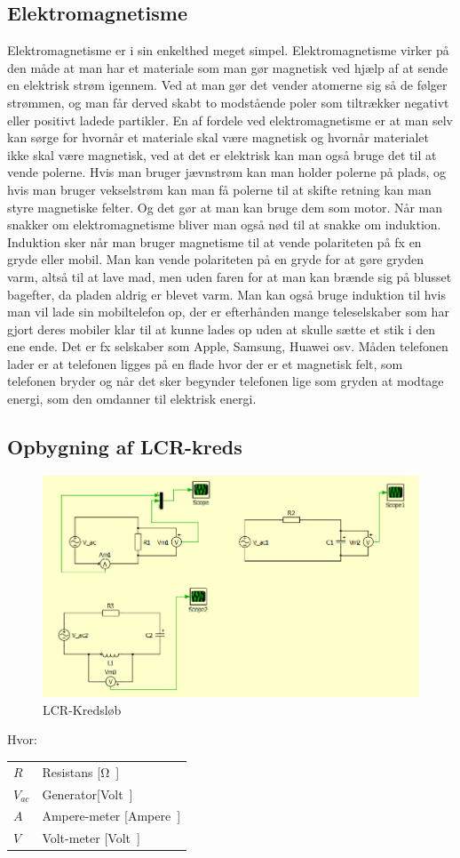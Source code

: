 \subsection{Elektromagnetisme}
Elektromagnetisme er i sin enkelthed meget simpel. Elektromagnetisme virker på den måde at man har et materiale som man gør magnetisk ved hjælp af at sende en elektrisk strøm igennem. Ved at man gør det vender atomerne sig så de følger strømmen, og man får derved skabt to modstående poler som tiltrækker negativt eller positivt ladede partikler. En af fordele ved elektromagnetisme er at man selv kan sørge for hvornår et materiale skal være magnetisk og hvornår materialet ikke skal være magnetisk, ved at det er elektrisk kan man også bruge det til at vende polerne. Hvis man bruger jævnstrøm kan man holder polerne på plads, og hvis man bruger vekselstrøm kan man få polerne til at skifte retning kan man styre magnetiske felter. Og det gør at man kan bruge dem som motor. Når man snakker om elektromagnetisme bliver man også nød til at snakke om induktion. Induktion sker når man bruger magnetisme til at vende polariteten på fx en gryde eller mobil. Man kan vende polariteten på en gryde for at gøre gryden varm, altså til at lave mad, men uden faren for at man kan brænde sig på blusset bagefter, da pladen aldrig er blevet varm. Man kan også bruge induktion til hvis man vil lade sin mobiltelefon op, der er efterhånden mange teleselskaber som har gjort deres mobiler klar til at kunne lades op uden at skulle sætte et stik i den ene ende. Det er fx selskaber som Apple, Samsung, Huawei osv. Måden telefonen lader er at telefonen ligges på en flade hvor der er et magnetisk felt, som telefonen bryder og når det sker begynder telefonen lige som gryden at modtage energi, som den omdanner til elektrisk energi. \cite{mikro}

\newpage
\subsection{Opbygning af LCR-kreds}
\begin{figure}[htbp]
	\centering
	\includegraphics[width=1\textwidth]{Vildledning/Schematics/Eks1_LCR.png}
	\caption{LCR-Kredsløb}
	\label{forslag1}
\end{figure}

Hvor:
\begin{table}[H]
	\begin{tabular}{l|l}
	$R$     & Resistans [\si \ohm] \\
	$V_{ac}$ 	   &  Generator[\si Volt] \\
	$A$ 	   & Ampere-meter [\si Ampere] \\
	$V$			& Volt-meter [\si Volt]
	\end{tabular}
\end{table}
